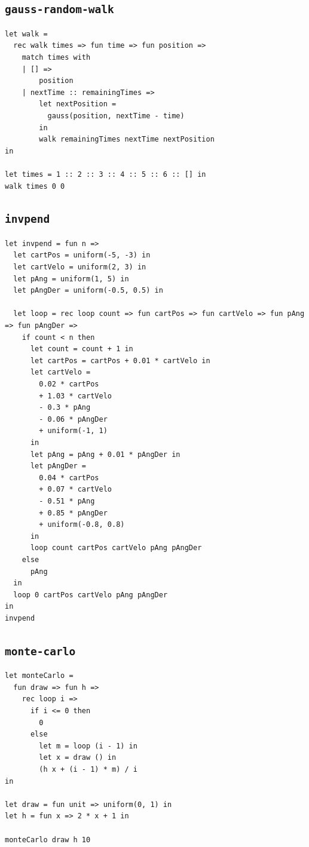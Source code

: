 \subsection{\texttt{gauss-random-walk}}

\begin{lstlisting}[breaklines=true]
let walk =
  rec walk times => fun time => fun position =>
    match times with
    | [] =>
        position
    | nextTime :: remainingTimes =>
        let nextPosition =
          gauss(position, nextTime - time)
        in
        walk remainingTimes nextTime nextPosition
in

let times = 1 :: 2 :: 3 :: 4 :: 5 :: 6 :: [] in
walk times 0 0
\end{lstlisting}

\subsection{\texttt{invpend}}

\begin{lstlisting}[breaklines=true]
let invpend = fun n =>
  let cartPos = uniform(-5, -3) in
  let cartVelo = uniform(2, 3) in
  let pAng = uniform(1, 5) in
  let pAngDer = uniform(-0.5, 0.5) in

  let loop = rec loop count => fun cartPos => fun cartVelo => fun pAng => fun pAngDer =>
    if count < n then
      let count = count + 1 in
      let cartPos = cartPos + 0.01 * cartVelo in
      let cartVelo =
        0.02 * cartPos
        + 1.03 * cartVelo
        - 0.3 * pAng
        - 0.06 * pAngDer
        + uniform(-1, 1)
      in
      let pAng = pAng + 0.01 * pAngDer in
      let pAngDer =
        0.04 * cartPos
        + 0.07 * cartVelo
        - 0.51 * pAng
        + 0.85 * pAngDer
        + uniform(-0.8, 0.8)
      in
      loop count cartPos cartVelo pAng pAngDer
    else
      pAng
  in
  loop 0 cartPos cartVelo pAng pAngDer
in
invpend
\end{lstlisting}

\subsection{\texttt{monte-carlo}}

\begin{lstlisting}[breaklines=true]
let monteCarlo =
  fun draw => fun h =>
    rec loop i =>
      if i <= 0 then
        0
      else
        let m = loop (i - 1) in
        let x = draw () in
        (h x + (i - 1) * m) / i
in

let draw = fun unit => uniform(0, 1) in
let h = fun x => 2 * x + 1 in

monteCarlo draw h 10
\end{lstlisting}

